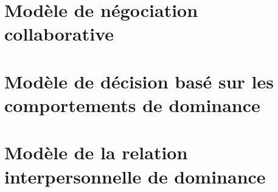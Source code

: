 \documentclass[a4paper, 11pt]{book}
\begin{document}
	
%	
	\chapter{Modèle de négociation collaborative}
		\minitoc
%		
	
%	
	\chapter{Modèle de décision basé sur les comportements de dominance}
	\minitoc
	
	
	\chapter{Modèle de la relation interpersonnelle de dominance}
	\minitoc
	

%
%	
%
		
			\label{chap:Annexe}

	
	
\end{document}
